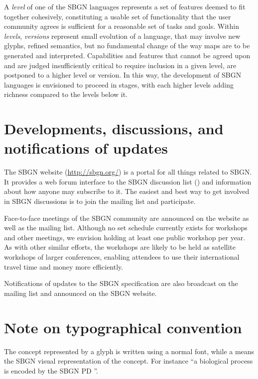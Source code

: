 A \emph{level} of one of the SBGN languages represents a set of features 
deemed to fit together cohesively, constituting a usable set of 
functionality that the user community agrees is sufficient for a reasonable 
set of tasks and goals.  Within \emph{levels}, \emph{versions} represent 
small evolution of a language, that may involve new glyphs, refined 
semantics, but no fundamental change of the way maps are to be generated 
and interpreted. Capabilities and features that cannot be agreed upon and 
are judged insufficiently critical to require inclusion in a given level, 
are postponed to a higher level or version.  In this way, the development 
of SBGN languages is envisioned to proceed in stages, with each higher 
levels adding richness compared to the levels below it.

\section{Developments, discussions, and notifications of updates}
\label{sec:discussions}

The SBGN website (\url{http://sbgn.org/}) is a portal for all things 
related to SBGN.  It provides a web forum interface to the SBGN discussion 
list () and information about how anyone 
may subscribe to it.  The easiest and best way to get involved in SBGN 
discussions is to join the mailing list and participate.

Face-to-face meetings of the SBGN community are announced on the website as 
well as the mailing list.  Although no set schedule currently exists for 
workshops and other meetings, we envision holding at least one public 
workshop per year.  As with other similar efforts, the workshops are likely 
to be held as satellite workshops of larger conferences, enabling attendees 
to use their international travel time and money more efficiently.

Notifications of updates to the SBGN specification are also broadcast on 
the mailing list and announced on the SBGN website.

\section{Note on typographical convention}
The concept represented by a glyph is written using a normal font, while a 
 means the SBGN visual representation of the concept. For 
instance ``a biological process is encoded by the SBGN PD ''.

